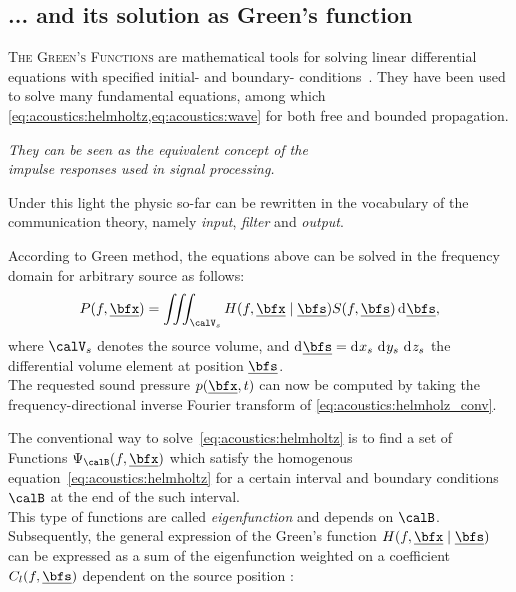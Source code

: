 \subsection{... and its solution as Green's function}
\textsc{The Green's Functions} are mathematical tools for solving linear differential equations with specified initial- and boundary- conditions~\cite{duffy2015green}.
They have been used to solve many fundamental equations, among which \cref{eq:acoustics:helmholtz,eq:acoustics:wave} for both free and bounded propagation.
\begin{center}
    \textit{
    They can be seen as the equivalent concept of the
    \\ \emph{impulse responses}
    used in signal processing.}
\end{center}
Under this light the physic so-far can be rewritten in the vocabulary of the communication theory, namely \textit{input}, \textit{filter} and \textit{output}.

According to Green method, the equations above can be solved in the frequency domain for arbitrary source as follows:
\begin{equation}
    \label{eq:acoustics:helmholz_conv}
    P(f, \positionMicrophone) = \iiint_{\volume_\contSource} H(f, \positionMicrophone \mid \positionSource) S(f, \positionSource) \kdiff\positionSource
    ,
\end{equation}
where $\volume_\contSource$ denotes the source volume,
and  $\kdiff\positionSource =  \kdiff{x_\contSource}\,\kdiff{y_\contSource}\,\kdiff{z_\contSource}$ the  differential  volume element at position $\positionSource$.
\\The requested sound pressure $\pressureSpaceTime$ can now be computed by taking the frequency-directional inverse Fourier transform of \cref{eq:acoustics:helmholz_conv}.

The conventional way to solve~\cref{eq:acoustics:helmholtz} is to find a set of Functions
$\Psi_\boundariesConditions(f, \positionMicrophone)$
which satisfy the homogenous equation~\cref{eq:acoustics:helmholtz}
for a certain interval
and boundary conditions $\boundariesConditions$ at the end of the such interval.
\\This type of functions are called \textit{eigenfunction} and depends on $\boundariesConditions$.
Subsequently, the general expression of the Green's function $H(f, \positionMicrophone \mid \positionSource)$ can be expressed as a sum of the eigenfunction weighted on
a coefficient $C_l(f, \positionSource)$ dependent on the source position :

